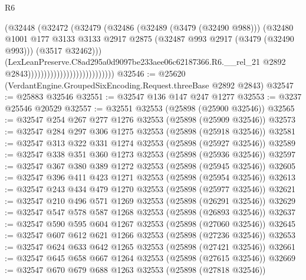 \begin{lexlean}{R6}
\begin{coremodule}
                                                  (@32448
                                                    (@32472
                                                      (@32479
                                                        (@32486
                                                          (@32489 (@3479 (@32490 @988)))
                                                          (@32480
                                                            @1001
                                                            @177
                                                            @3133
                                                            @3133
                                                            @2917
                                                            @2875
                                                            (@32487
                                                              @993
                                                              @2917
                                                              (@3479 (@32490 @993)))
                                                            (@3517 @32462)))
                                                        (LexLeanPreserve.C8ad295a0d9097be233aee06c62187366.R6.__rel_21
                                                          @2892
                                                          @2843)))))))))))))))))))))))))))
@32546 := @25620 (VerdantEngine.GroupedSixEncoding.Request.threeBase @2892 @2843)
@32547 := @25883 @32546
@32551 := @32547 @136 @147 @247 @1277
@32553 := @3237 @25546 @20529
@32557 := @32551 @32553 (@25898 (@25900 @32546))
@32565 := @32547 @254 @267 @277 @1276 @32553 (@25898 (@25909 @32546))
@32573 := @32547 @284 @297 @306 @1275 @32553 (@25898 (@25918 @32546))
@32581 := @32547 @313 @322 @331 @1274 @32553 (@25898 (@25927 @32546))
@32589 := @32547 @338 @351 @360 @1273 @32553 (@25898 (@25936 @32546))
@32597 := @32547 @367 @380 @389 @1272 @32553 (@25898 (@25945 @32546))
@32605 := @32547 @396 @411 @423 @1271 @32553 (@25898 (@25954 @32546))
@32613 := @32547 @243 @434 @479 @1270 @32553 (@25898 (@25977 @32546))
@32621 := @32547 @210 @496 @571 @1269 @32553 (@25898 (@26291 @32546))
@32629 := @32547 @547 @578 @587 @1268 @32553 (@25898 (@26893 @32546))
@32637 := @32547 @590 @595 @604 @1267 @32553 (@25898 (@27060 @32546))
@32645 := @32547 @607 @612 @621 @1266 @32553 (@25898 (@27236 @32546))
@32653 := @32547 @624 @633 @642 @1265 @32553 (@25898 (@27421 @32546))
@32661 := @32547 @645 @658 @667 @1264 @32553 (@25898 (@27615 @32546))
@32669 := @32547 @670 @679 @688 @1263 @32553 (@25898 (@27818 @32546))

\end{coremodule}
\end{lexlean}
